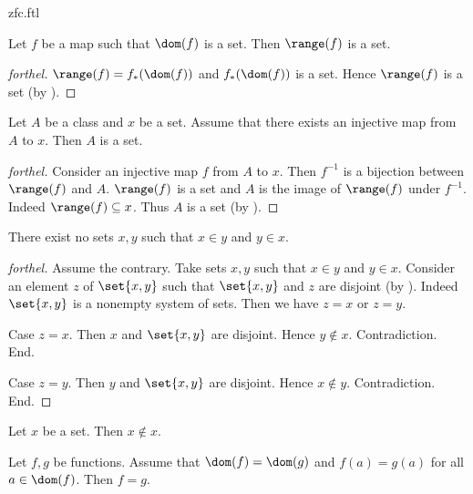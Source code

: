 \documentclass{naproche-library}
\begin{document}
\begin{smodule}[title=ZFC]{zfc.ftl}
\begin{proposition}[forthel,id=FOUNDATIONS_10_7598384349184000]
  Let $f$ be a map such that $\dom(f)$ is a set.
  Then $\range(f)$ is a set.
\end{proposition}
\begin{proof}[forthel]
  $\range(f) = f_{*}(\dom(f))$ and $f_{*}(\dom(f))$ is a set.
  Hence $\range(f)$ is a set (by ).
\end{proof}

\begin{proposition}[forthel,id=FOUNDATIONS_10_8631339572002816]
  Let $A$ be a class and $x$ be a set.
  Assume that there exists an injective map from $A$ to $x$.
  Then $A$ is a set.
\end{proposition}
\begin{proof}[forthel]
  Consider an injective map $f$ from $A$ to $x$.
  Then $f^{-1}$ is a bijection between $\range(f)$ and $A$.
  $\range(f)$ is a set and $A$ is the image of $\range(f)$ under $f^{-1}$.
  Indeed $\range(f) \subseteq x$.
  Thus $A$ is a set (by ).
\end{proof}

\begin{proposition}[forthel,id=FOUNDATIONS_10_8812282138066944]
  There exist no sets $x, y$ such that $x \in y$ and $y \in x$.
\end{proposition}
\begin{proof}[forthel]
  Assume the contrary.
  Take sets $x,y$ such that $x \in y$ and $y \in x$.
  Consider an element $z$ of $\set{x,y}$ such that $\set{x,y}$ and $z$ are disjoint (by ).
  Indeed $\set{x,y}$ is a nonempty system of sets.
  Then we have $z = x$ or $z = y$.

  Case $z = x$.
    Then $x$ and $\set{x,y}$ are disjoint.
    Hence $y \notin x$.
    Contradiction.
  End.

  Case $z = y$.
    Then $y$ and $\set{x,y}$ are disjoint.
    Hence $x \notin y$.
    Contradiction.
  End.
\end{proof}

\begin{corollary}[forthel,id=FOUNDATIONS_10_3086917813927936]
  Let $x$ be a set.
  Then $x \notin x$.
\end{corollary}

\begin{proposition}[forthel,id=FOUNDATIONS_10_4589652321021547]
  Let $f, g$ be functions.
  Assume that $\dom(f) = \dom(g)$ and $f(a) = g(a)$ for all $a \in \dom(f)$.
  Then $f = g$.
\end{proposition}


\end{smodule}
\end{document}
